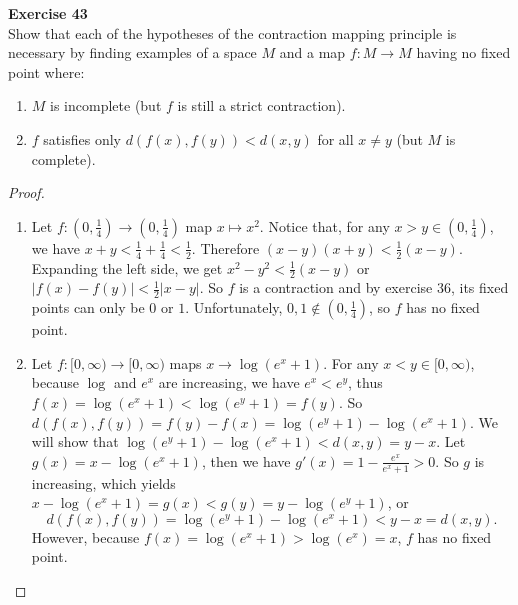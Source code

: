 \documentclass[12pt, a4paper]{article}
\theoremstyle{plain}
\newenvironment{exercise}[2][Exercise]
    { \begin{mdframed}[backgroundcolor=gray!20] \textbf{#1 #2} \\}
    {  \end{mdframed}}
\begin{document}
\begin{exercise}{43}
Show that each of the hypotheses of the contraction mapping principle is necessary by finding examples of a space $M$ and a map $f: M \rightarrow M$ having no fixed point where:
\begin{enumerate}[label=(\alph*)]
\item $M$ is incomplete (but $f$ is still a strict contraction).
\item $f$ satisfies only $d(f(x),f(y))<d(x,y)$ for all $x\neq y$ (but $M$ is complete).
\end{enumerate}
\end{exercise}
\begin{proof}
\hfill
\begin{enumerate}[label=(\alph*)]
\item Let $f:(0,\frac{1}{4})\rightarrow (0,\frac{1}{4})$ map $x\mapsto x^2$. Notice that, for any $x>y\in (0,\frac{1}{4})$, we have $x+y<\frac{1}{4}+\frac{1}{4}<\frac{1}{2}$. Therefore $(x-y)(x+y)<\frac{1}{2}(x-y)$. Expanding the left side, we get $x^2-y^2<\frac{1}{2} (x-y)$ or $|f(x)-f(y)|<\frac{1}{2}|x-y|$. So $f$ is a contraction and by exercise 36, its fixed points can only be $0$ or $1$. Unfortunately, $0,1\not\in (0,\frac{1}{4})$, so $f$ has no fixed point.

\item Let $f:[0,\infty)\rightarrow [0,\infty)$ maps $x\rightarrow \log(e^x+1)$. For any $x<y\in [0,\infty)$, because $\log$ and $e^x$ are increasing, we have $e^x<e^y$, thus $f(x)=\log(e^x+1)<\log(e^y+1)=f(y)$. So $d(f(x),f(y))=f(y)-f(x)=\log(e^y+1)-\log(e^x+1)$. We will show that $\log(e^y+1)-\log(e^x+1)<d(x,y)=y-x$. Let $g(x)=x-\log(e^x+1)$, then we have $g'(x)=1-\frac{e^x}{e^x+1}>0$. So $g$ is increasing, which yields $x-\log(e^x+1)=g(x)<g(y)=y-\log(e^y+1)$, or 
\[
d(f(x),f(y))=\log(e^y+1)-\log(e^x+1)<y-x = d(x,y).
\]
However, because $f(x)=\log(e^x+1)>\log(e^x)=x$, $f$ has no fixed point.
\end{enumerate}
\end{proof}
\end{document}
